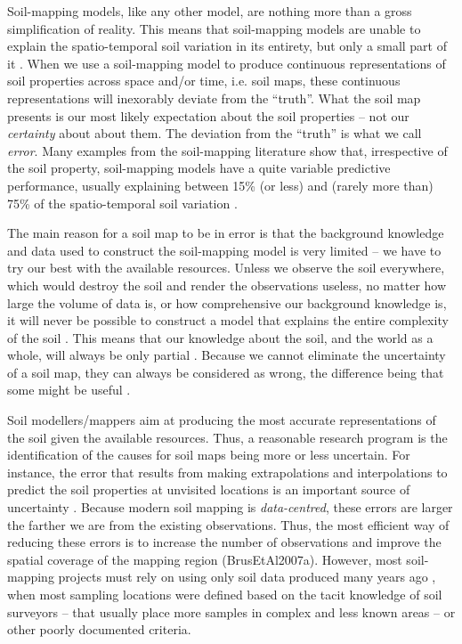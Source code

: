 Soil-mapping models, like any other model, are nothing more than a gross simplification of reality.
This means that soil-mapping models are unable to explain the spatio-temporal soil variation in 
its entirety, but only a small part of it \citep{Heuvelink1998a}. When we use a soil-mapping model
to produce continuous representations of soil properties across space and/or time, i.e. soil
maps, these continuous representations will inexorably deviate from the ``truth''. What the soil map
presents is our most likely expectation about the soil properties -- not our \textit{certainty} about
about them. The deviation from the ``truth'' is what we call \textit{error}. Many examples from the 
soil-mapping literature show that, irrespective of the soil property, soil-mapping models have a 
quite variable predictive performance, usually explaining between 15\% (or less) and (rarely more 
than) 75\% of the spatio-temporal soil variation \citep{MooreEtAl1993, OdehEtAl1994, GesslerEtAl1995, 
McKenzieEtAl1999, GobinEtAl2001, SumflethEtAl2008, SunEtAl2012, ViscarraRosselEtAl2013, 
NussbaumEtAl2014, HenglEtAl2015, GaschEtAl2015, HeungEtAl2016}.

The main reason for a soil map to be in error is that the background knowledge and data used to 
construct the soil-mapping model is very limited -- we have to try our best with the available 
resources. Unless we observe the soil everywhere, which would destroy the soil and render the 
observations useless, no matter how large the volume of data is, or how comprehensive our background
knowledge is, it will never be possible to construct a model that explains the entire complexity of 
the soil \citep{Tukey1997}. This means that our knowledge about the soil, and the world as a whole, 
will always be only partial \citep{Box1993}. Because we cannot eliminate the uncertainty of a soil 
map, they can always be considered as wrong, the difference being that some might be useful 
\citep{Box1976}.

Soil modellers/mappers aim at producing the most accurate representations of the soil given the 
available resources. Thus, a reasonable research program is the identification of the causes for 
soil maps being more or less uncertain. For instance, the error that results from making 
extrapolations and interpolations to predict the soil properties at unvisited locations is an 
important source of uncertainty \citep{HeuvelinkEtAl1999, RefsgaardEtAl2006}. Because modern soil 
mapping is \textit{data-centred}, these errors are larger the farther we are from the existing 
observations. Thus, the most efficient way of reducing these errors is to increase the number of 
observations and improve the spatial coverage of the mapping region (BrusEtAl2007a). However, most 
soil-mapping projects must rely on using only soil data produced many years ago \citep{KempenEtAl2009, 
HenglEtAl2014, PoggioEtAl2014, NussbaumEtAl2014, MulderEtAl2016}, when most sampling locations were 
defined based on the tacit knowledge of soil surveyors -- that usually place more samples in complex 
and less known areas \citep{Rossiter2000} -- or other poorly documented criteria.


